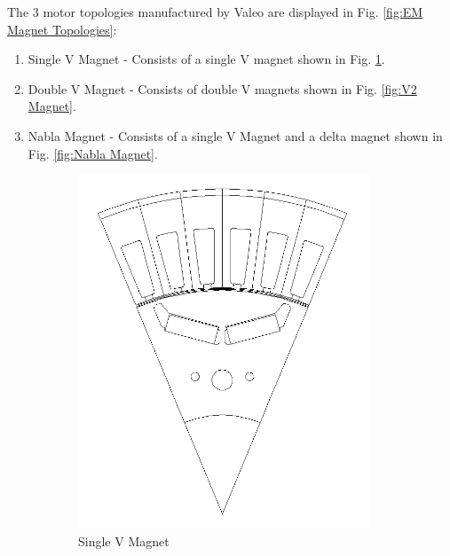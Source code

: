 \documentclass{report} %
\begin{document}
The 3 motor topologies manufactured by Valeo are displayed in Fig. \ref{fig:EM Magnet Topologies}:
\begin{enumerate}[nosep]
    \item Single V Magnet - Consists of a single V magnet shown in Fig. \ref{fig:V1 Magnet}.
    \item Double V Magnet - Consists of double V magnets shown in Fig. \ref{fig:V2 Magnet}.
    \item Nabla Magnet - Consists of a single V Magnet and a delta magnet shown in Fig. \ref{fig:Nabla Magnet}.
\end{enumerate}

\begin{figure}[H]
    \centering
    \begin{subfigure}{0.32\textwidth}
        \centering
        \includegraphics[width=\textwidth]{./ReportImages/1V_Magnet.png}
        \caption{Single V Magnet}
        \label{fig:V1 Magnet}
    \end{subfigure}\hfill
    \begin{subfigure}{0.32\textwidth}
        \centering

\end{subfigure}
\end{figure}
\end{document}
